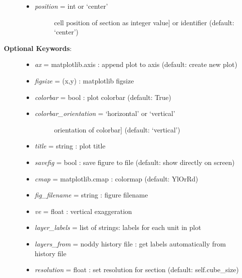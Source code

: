 \documentclass[a4paper,10pt,english]{sphinxmanual}
\begin{document}
\begin{fulllineitems}
\begin{fulllineitems}
\begin{description}
\begin{itemize}
\item {} \begin{description}
\item[{\emph{position} = int or `center'}] \leavevmode{[}cell position of section as integer value{]}
or identifier (default: `center')

\end{description}

\end{itemize}

\item[{\textbf{Optional Keywords}:}] \leavevmode\begin{itemize}
\item {} 
\emph{ax} = matplotlib.axis : append plot to axis (default: create new plot)

\item {} 
\emph{figsize} = (x,y) : matplotlib figsize

\item {} 
\emph{colorbar} = bool : plot colorbar (default: True)

\item {} \begin{description}
\item[{\emph{colorbar\_orientation} = `horizontal' or `vertical'}] \leavevmode{[}orientation of colorbar{]}
(default: `vertical')

\end{description}

\item {} 
\emph{title} = string : plot title

\item {} 
\emph{savefig} = bool : save figure to file (default: show directly on screen)

\item {} 
\emph{cmap} = matplotlib.cmap : colormap (default: YlOrRd)

\item {} 
\emph{fig\_filename} = string : figure filename

\item {} 
\emph{ve} = float : vertical exaggeration

\item {} 
\emph{layer\_labels} = list of strings: labels for each unit in plot

\item {} 
\emph{layers\_from} = noddy history file : get labels automatically from history file

\item {} 
\emph{resolution} = float : set resolution for section (default: self.cube\_size)


\end{itemize}
\end{description}
\end{fulllineitems}
\end{fulllineitems}
\end{document}

